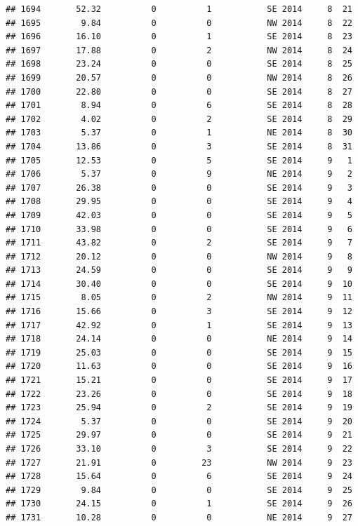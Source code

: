 \documentclass[
]{article}
\begin{document}
\begin{verbatim}
## 1694       52.32          0          1           SE 2014     8  21
## 1695        9.84          0          0           NW 2014     8  22
## 1696       16.10          0          1           SE 2014     8  23
## 1697       17.88          0          2           NW 2014     8  24
## 1698       23.24          0          0           SE 2014     8  25
## 1699       20.57          0          0           NW 2014     8  26
## 1700       22.80          0          0           SE 2014     8  27
## 1701        8.94          0          6           SE 2014     8  28
## 1702        4.02          0          2           SE 2014     8  29
## 1703        5.37          0          1           NE 2014     8  30
## 1704       13.86          0          3           SE 2014     8  31
## 1705       12.53          0          5           SE 2014     9   1
## 1706        5.37          0          9           NE 2014     9   2
## 1707       26.38          0          0           SE 2014     9   3
## 1708       29.95          0          0           SE 2014     9   4
## 1709       42.03          0          0           SE 2014     9   5
## 1710       33.98          0          0           SE 2014     9   6
## 1711       43.82          0          2           SE 2014     9   7
## 1712       20.12          0          0           NW 2014     9   8
## 1713       24.59          0          0           SE 2014     9   9
## 1714       30.40          0          0           SE 2014     9  10
## 1715        8.05          0          2           NW 2014     9  11
## 1716       15.66          0          3           SE 2014     9  12
## 1717       42.92          0          1           SE 2014     9  13
## 1718       24.14          0          0           NE 2014     9  14
## 1719       25.03          0          0           SE 2014     9  15
## 1720       11.63          0          0           SE 2014     9  16
## 1721       15.21          0          0           SE 2014     9  17
## 1722       23.26          0          0           SE 2014     9  18
## 1723       25.94          0          2           SE 2014     9  19
## 1724        5.37          0          0           SE 2014     9  20
## 1725       29.97          0          0           SE 2014     9  21
## 1726       33.10          0          3           SE 2014     9  22
## 1727       21.91          0         23           NW 2014     9  23
## 1728       15.64          0          6           SE 2014     9  24
## 1729        9.84          0          0           SE 2014     9  25
## 1730       24.15          0          1           SE 2014     9  26
## 1731       10.28          0          0           NE 2014     9  27

\end{verbatim}
\end{document}
